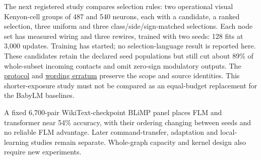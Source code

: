 \documentclass[10pt]{article}
\begin{document}
The next registered study compares selection rules: two operational visual
Kenyon-cell groups of 487 and 540 neurons, each with a candidate, a ranked
selection, three uniform and three class/side/sign-matched selections. Each
node set has measured wiring and three rewires, trained with two seeds:
128 fits at 3,000 updates. Training has started; no selection-language result
is reported here. These candidates retain the declared seed populations but
still cut about 89\% of whole-subset incoming contacts and omit zero-sign
modulatory outputs. The \href{https://flm.kuber.studio/research/selection-language-protocol.md}{protocol}
and \href{https://flm.kuber.studio/research/selection-language-errata.md}{wording erratum}
preserve the scope and source identities. This shorter-exposure study must
not be compared as an equal-budget replacement for the BabyLM baselines.

A fixed 6,700-pair WikiText-checkpoint BLiMP panel \cite{blimp} places FLM and
transformer near 54\% accuracy, with their ordering changing between seeds
and no reliable FLM advantage. Later command-transfer, adaptation and
local-learning studies remain separate. Whole-graph capacity and kernel design
also require new experiments.

\begingroup\raggedright


\endgroup
\end{document}
